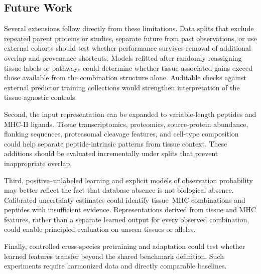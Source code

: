 \subsection{Future Work}

Several extensions follow directly from these limitations. Data splits that exclude repeated parent proteins or studies, separate future from past observations, or use external cohorts should test whether performance survives removal of additional overlap and provenance shortcuts. Models refitted after randomly reassigning tissue labels or pathways could determine whether tissue-associated gains exceed those available from the combination structure alone. Auditable checks against external predictor training collections would strengthen interpretation of the tissue-agnostic controls.

Second, the input representation can be expanded to variable-length peptides and MHC-II ligands. Tissue transcriptomics, proteomics, source-protein abundance, flanking sequences, proteasomal cleavage features, and cell-type composition could help separate peptide-intrinsic patterns from tissue context. These additions should be evaluated incrementally under splits that prevent inappropriate overlap.

Third, positive--unlabeled learning and explicit models of observation probability may better reflect the fact that database absence is not biological absence. Calibrated uncertainty estimates could identify tissue--MHC combinations and peptides with insufficient evidence. Representations derived from tissue and MHC features, rather than a separate learned output for every observed combination, could enable principled evaluation on unseen tissues or alleles.

Finally, controlled cross-species pretraining and adaptation could test whether learned features transfer beyond the shared benchmark definition. Such experiments require harmonized data and directly comparable baselines.
